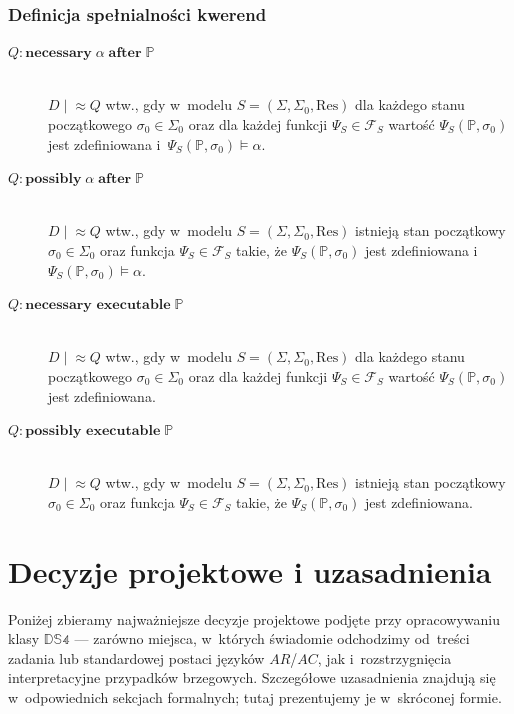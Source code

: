 \documentclass[11pt,a4paper]{article}
\theoremstyle{definition}
\begin{document}
\subsubsection*{Definicja spełnialności kwerend}
\begin{description}
    \item[$Q: \textbf{necessary}\; \alpha \;\textbf{after}\; \mathbb{P}$] \hfill \\
        $D \mid \! \approx Q$ wtw., gdy w~modelu $S = (\Sigma, \Sigma_0, \mathrm{Res})$ dla każdego stanu początkowego $\sigma_0 \in \Sigma_0$ oraz dla każdej funkcji $\Psi_S \in \mathcal{F}_S$ wartość $\Psi_S(\mathbb{P}, \sigma_0)$ jest zdefiniowana i~$\Psi_S(\mathbb{P}, \sigma_0) \models \alpha$.
    \item[$Q: \textbf{possibly}\; \alpha \;\textbf{after}\; \mathbb{P}$] \hfill \\
        $D \mid \! \approx Q$ wtw., gdy w~modelu $S = (\Sigma, \Sigma_0, \mathrm{Res})$ istnieją stan początkowy $\sigma_0 \in \Sigma_0$ oraz funkcja $\Psi_S \in \mathcal{F}_S$ takie, że $\Psi_S(\mathbb{P}, \sigma_0)$ jest zdefiniowana i~$\Psi_S(\mathbb{P}, \sigma_0) \models \alpha$.
    \item[$Q: \textbf{necessary executable}\; \mathbb{P}$] \hfill \\
        $D \mid \! \approx Q$ wtw., gdy w~modelu $S = (\Sigma, \Sigma_0, \mathrm{Res})$ dla każdego stanu początkowego $\sigma_0 \in \Sigma_0$ oraz dla każdej funkcji $\Psi_S \in \mathcal{F}_S$ wartość $\Psi_S(\mathbb{P}, \sigma_0)$ jest zdefiniowana.
    \item[$Q: \textbf{possibly executable}\; \mathbb{P}$] \hfill \\
        $D \mid \! \approx Q$ wtw., gdy w~modelu $S = (\Sigma, \Sigma_0, \mathrm{Res})$ istnieją stan początkowy $\sigma_0 \in \Sigma_0$ oraz funkcja $\Psi_S \in \mathcal{F}_S$ takie, że $\Psi_S(\mathbb{P}, \sigma_0)$ jest zdefiniowana.
\end{description}
\section{Decyzje projektowe i uzasadnienia}
\label{sec:decyzje-projektowe}

Poniżej zbieramy najważniejsze decyzje projektowe podjęte przy opracowywaniu klasy $\mathbb{DS4}$ --- zarówno miejsca, w~których świadomie odchodzimy od~treści zadania lub standardowej postaci języków $AR$/$AC$, jak i~rozstrzygnięcia interpretacyjne przypadków brzegowych. Szczegółowe uzasadnienia znajdują się w~odpowiednich sekcjach formalnych; tutaj prezentujemy je w~skróconej formie.
\end{document}
